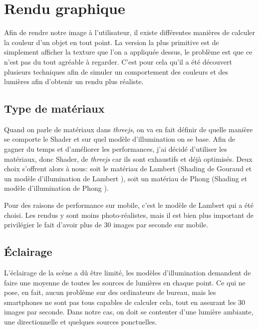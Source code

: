 \section{Rendu graphique}
Afin de rendre notre image à l'utilisateur, il existe différentes manières de calculer la couleur d'un objet en tout point. La version la plus primitive est de simplement afficher la texture que l'on a appliquée dessus, le problème est que ce n'est pas du tout agréable à regarder. C'est pour cela qu'il a été découvert plusieurs techniques afin de simuler un comportement des couleurs et des lumières afin d'obtenir un rendu plus réaliste.

\subsection{Type de matériaux}
 Quand on parle de matériaux dans \textit{threejs}, on va en fait définir de quelle manière se comporte le Shader \cite{wiki-shader} et sur quel modèle d'illumination on se base. Afin de gagner du temps et d'améliorer les performances, j'ai décidé d'utiliser les matériaux, donc Shader, de \textit{threejs} car ils sont exhaustifs et déjà optimisés. Deux choix s'offrent alors à nous: soit le matériau de Lambert (Shading de Gouraud \cite{wiki-gouraud} et un modèle d'illumination de Lambert \cite{wiki-lambert}), soit un matériau de Phong (Shading et modèle d'illumination de Phong \cite{wiki-phong-shading} \cite{wiki-phong-reflectance}).

Pour des raisons de performance sur mobile, c'est le modèle de Lambert qui a été choisi. Les rendus y sont moins photo-réalistes, mais il est bien plus important de privilégier le fait d'avoir plus de 30 images par seconde sur mobile.


\subsection{Éclairage}
L'éclairage de la scène a dû être limité, les modèles d'illumination demandent de faire une moyenne de toutes les sources de lumières en chaque point. Ce qui ne pose, en fait, aucun problème sur des ordinateurs de bureau, mais les smartphones ne sont pas tous capables de calculer cela, tout en assurant les 30 images par seconde. Dans notre cas, on doit se contenter d'une lumière ambiante, une directionnelle et quelques sources ponctuelles. 